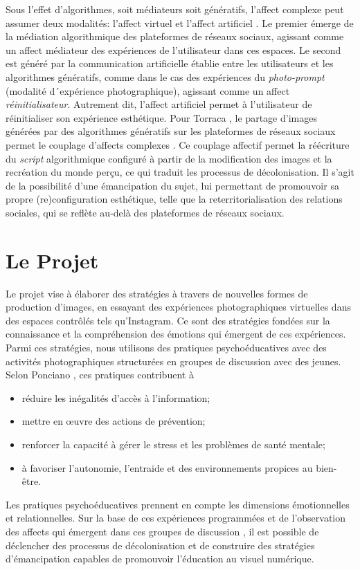 \documentclass[final,fra]{anthology-ch}         %
\begin{document}
Sous l'effet d'algorithmes, soit médiateurs soit génératifs, l'affect complexe peut assumer deux modalités: l'affect virtuel et l'affect artificiel \cite{torraca2024antropofagia}. Le premier émerge de la médiation algorithmique des plateformes de réseaux sociaux, agissant comme un affect médiateur des expériences de l'utilisateur dans ces espaces. Le second est généré par la \og communication artificielle\fg{} \cite{esposito2022artificial} établie entre les utilisateurs et les algorithmes génératifs, comme dans le cas des expériences du \emph{photo-prompt} (modalité d´expérience photographique), agissant comme un affect \emph{réinitialisateur}. Autrement dit, l'affect artificiel permet à l'utilisateur de réinitialiser son expérience esthétique. Pour Torraca \cite{torraca2024antropofagia}, le partage d'images générées par des algorithmes génératifs sur les plateformes de réseaux sociaux permet le couplage d'affects complexes \cite{torraca2024antropofagia}. Ce couplage affectif permet la réécriture du \textit{script} algorithmique configuré à partir de la modification des images et la recréation du monde perçu, ce qui traduit les processus de décolonisation. Il s'agit de la possibilité d'une émancipation du sujet, lui permettant de promouvoir sa propre (re)configuration esthétique, telle que la reterritorialisation des relations sociales, qui se reflète au-delà des plateformes de réseaux sociaux.

\section{Le Projet}

Le projet vise à élaborer des stratégies à travers de nouvelles formes de production d'images, en essayant des expériences photographiques virtuelles dans des espaces contrôlés tels qu'Instagram. Ce sont des stratégies fondées sur la connaissance et la compréhension des émotions qui émergent de ces expériences. Parmi ces stratégies, nous utilisons des pratiques psychoéducatives avec des activités photographiques structurées en groupes de discussion \cite{abreu2009grupos} avec des jeunes. Selon Ponciano \cite{ponciano2024praticas}, ces pratiques contribuent à 
\begin{itemize}
    \item réduire les inégalités d'accès à l'information;
    \item mettre en œuvre des actions de prévention;
    \item renforcer la capacité à gérer le stress et les problèmes de santé mentale;
    \item à favoriser l'autonomie, l'entraide et des environnements propices au bien-être.
\end{itemize}
 \noindent Les pratiques psychoéducatives \cite{ponciano2024praticas} prennent en compte les dimensions émotionnelles et relationnelles. Sur la base de ces expériences programmées et de l'observation des affects qui émergent dans ces groupes de discussion \cite{abreu2009grupos}, il est possible de déclencher des processus de décolonisation et de construire des stratégies d'émancipation capables de promouvoir l'éducation au visuel numérique.
\end{document}
